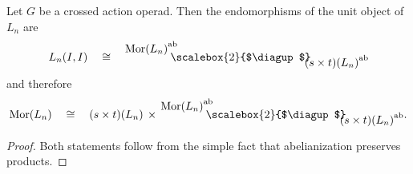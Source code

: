 \documentclass{amsbook} %
\newcommand{\bigquotient}[2]{ \raisebox{0.75\height}{$#1$} \mkern-12mu\scalebox{2}{$\diagup$}\mkern-10mu \raisebox{-0.5\height}{$#2$} }
\numberwithin{section}{chapter}
\begin{document}
\begin{prop}\label{Zmor1} Let $G$ be a crossed action operad. Then the endomorphisms of the unit object of $L_n$ are
\[ L_n(I, I) \quad \cong \quad \bigquotient{{\mathrm{Mor}(L_n)}^{\mathrm{ab}}}{{(s \times t)(L_n)}^{\mathrm{ab}}} \]
and therefore
\[ \mathrm{Mor}(L_n) \quad \cong \quad (s \times t)(L_n) \, \times \, \bigquotient{{\mathrm{Mor}(L_n)}^{\mathrm{ab}}}{{(s \times t)(L_n)}^{\mathrm{ab}}}. \]
\end{prop}
\begin{proof}
Both statements follow from the simple fact that abelianization preserves products.
\end{proof}
\end{document}

